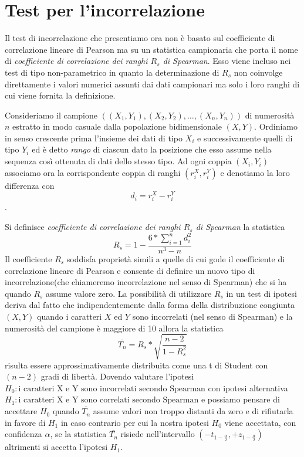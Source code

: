 \section{Test per l'incorrelazione}
Il test di incorrelazione che presentiamo ora non è basato sul coefficiente di correlazione lineare di Pearson 
ma su un statistica campionaria che porta il nome di \emph{coefficiente di correlazione dei ranghi $R_s$ di Spearman}.\newline
Esso viene incluso nei test di tipo non-parametrico in quanto la determinazione di $R_s$ non coinvolge direttamente
i valori numerici assunti dai dati campionari ma solo i loro ranghi di cui viene fornita la definizione.

Consideriamo il campione $((X_1, Y_1), (X_2, Y_2), \dots, (X_n, Y_n))$ di numerosità $n$ estratto in modo casuale
dalla popolazione bidimensionale $(X,Y)$.\newline
Ordiniamo in senso crescente prima l’insieme dei dati di tipo $X_i$ e successivamente quelli di tipo $Y_i$ ed è detto
\emph{rango} di ciascun dato la posizione che esso assume nella sequenza così ottenuta di dati dello stesso tipo.\newline
Ad ogni coppia $(X_i, Y_i)$ associamo ora la corrispondente coppia di ranghi $(r_i^X, r_i^Y)$ e denotiamo la loro differenza con
\[ d_i = r_i^X - r_i^Y \].

Si definisce \emph{coefficiente di correlazione dei ranghi $R_s$ di Spearman} la statistica 
\[ R_s = 1 - \frac{6 * \sum _{i = 1}^n d_i^2}{n^3 - n} \]
Il coefficiente $R_s$ soddisfa proprietà simili a quelle di cui gode il coefficiente di correlazione lineare di Pearson
e consente di definire un nuovo tipo di incorrelazione(che chiameremo incorrelazione nel senso di Spearman) 
che si ha quando $R_s$ assume valore zero.\newline
La possibilità di utilizzare $R_s$ in un test di ipotesi deriva dal fatto che indipendentemente dalla forma 
della distribuzione congiunta $(X,Y)$ quando i caratteri $X$ ed $Y$ sono incorrelati (nel senso di Spearman)
e la numerosità del campione è maggiore di 10 allora la statistica
\[ \bar{T_n} = R_s * \sqrt{\frac{n - 2}{1 - R_s^2}} \] 
risulta essere approssimativamente distribuita come una t di Student con $(n-2)$ gradi di libertà.\newline
Dovendo valutare l'ipotesi $H_0: \mbox{i caratteri X e Y sono incorrelati secondo Spearman}$ con ipotesi alternativa
$H_1: \mbox{i caratteri X e Y sono correlati secondo Spearman}$ e possiamo pensare di accettare $H_0$ quando $\bar{T_n}$
assume valori non troppo distanti da zero e di rifiutarla in favore di $H_1$ in caso contrario per cui la nostra ipotesi
$H_0$ viene accettata, con confidenza $\alpha$, se la statistica $\bar{T_n}$ risiede nell'intervallo 
$(-t_{1 - \frac{\alpha}{2}}, +z_{1 - \frac{\alpha}{2}})$ altrimenti si accetta l'ipotesi $H_1$.
